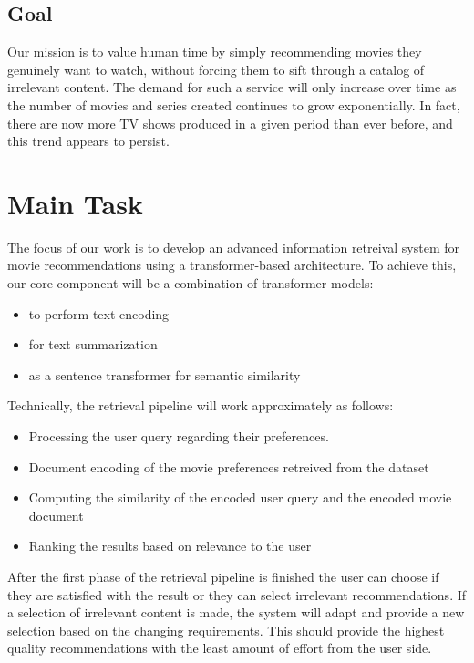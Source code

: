 \documentclass[11pt,a4paper]{article}
\begin{document}
  \subsection{Goal}
  Our mission is to value human time by simply recommending movies they genuinely want to watch, without forcing them to sift through a catalog of irrelevant content.
  The demand for such a service will only increase over time as the number of movies and series created continues to grow exponentially.
  In fact, there are now more TV shows produced in a given period than ever before, and this trend appears to persist.

  \section{Main Task}

  The focus of our work is to develop an advanced information retreival system for movie recommendations using a transformer-based architecture.
  To achieve this, our core component will be a combination of transformer models:
  \begin{itemize}
    \item to perform text encoding
    \item for text summarization
    \item as a sentence transformer for semantic similarity
  \end{itemize}

  \noindent Technically, the retrieval pipeline will work approximately as follows:
  \begin{itemize}
    \item Processing the user query regarding their preferences.
    \item Document encoding of the movie preferences retreived from the dataset
    \item Computing the similarity of the encoded user query and the encoded movie document
    \item Ranking the results based on relevance to the user
  \end{itemize}

  \noindent After the first phase of the retrieval pipeline is finished the user can choose if they are satisfied with the result or they can select irrelevant recommendations.
  If a selection of irrelevant content is made, the system will adapt and provide a new selection based on the changing requirements.
  This should provide the highest quality recommendations with the least amount of effort from the user side.
\end{document}
